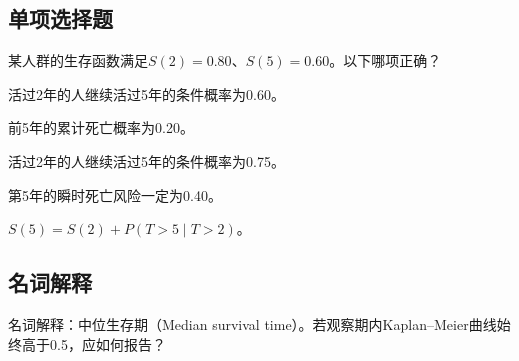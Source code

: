 \par\addvspace{8pt}\noindent\begin{minipage}{\linewidth}

\subsection{单项选择题}


某人群的生存函数满足\(S(2)=0.80\)、\(S(5)=0.60\)。以下哪项正确？

\begin{choices}

\item 活过2年的人继续活过5年的条件概率为0.60。

\item 前5年的累计死亡概率为0.20。

\item 活过2年的人继续活过5年的条件概率为0.75。

\item 第5年的瞬时死亡风险一定为0.40。

\item \(S(5)=S(2)+P(T>5\mid T>2)\)。

\end{choices}

\end{minipage}\par\vspace{5pt}

\par\addvspace{8pt}\noindent\begin{minipage}{\linewidth}

\subsection{名词解释}


名词解释：中位生存期（Median survival time）。若观察期内Kaplan--Meier曲线始终高于0.5，应如何报告？


\end{minipage}\par\vspace{5pt}

